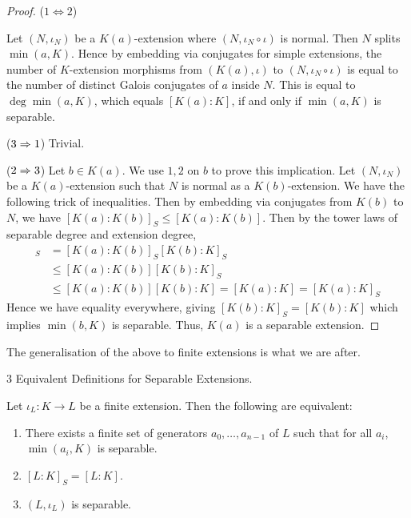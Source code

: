 \documentclass[../book.tex]{subfiles}
\begin{document}
\begin{proof}
    ($1\iff 2$)
    
        Let $(N,\iota_N)$ be a $K(a)$-extension where 
        $(N,\iota_N\circ\iota)$ is normal. 
        Then $N$ splits $\min(a,K)$. 
        Hence by embedding via conjugates for simple extensions,
        the number of $K$-extension morphisms 
        from $(K(a),\iota)$ to $(N,\iota_N\circ\iota)$
        is equal to the number of distinct Galois conjugates of $a$
        inside $N$. 
        This is equal to $\deg\min(a,K)$, which equals $[K(a):K]$,
        if and only if $\min(a,K)$ is separable. 
        
    ($3\Rightarrow 1$) 
        Trivial.
    
    ($2 \Rightarrow 3$)
        Let $b \in K(a)$. We use $1,2$ on $b$ to prove this implication. 
        Let $(N,\iota_N)$ be a $K(a)$-extension such that 
        $N$ is normal as a $K(b)$-extension. 
        We have the following trick of inequalities. 
        Then by embedding via conjugates from $K(b)$ to $N$, 
        we have $[K(a):K(b)]_S \leq [K(a):K(b)]$.
        Then by the tower laws of separable degree and extension degree,
        \begin{align*}
            [K(a) : K]_S &= [K(a):K(b)]_S [K(b):K]_S \\
            &\leq [K(a):K(b)] [K(b):K]_S \\
            &\leq [K(a):K(b)] [K(b):K] = [K(a):K] = [K(a):K]_S
        \end{align*}
        Hence we have equality everywhere, giving 
        $[K(b):K]_S = [K(b):K]$ which implies $\min(b,K)$ is separable.
        Thus, $K(a)$ is a separable extension. 
\end{proof}
The generalisation of the above to finite extensions is what we are after. 
\begin{thm} 3 Equivalent Definitions for Separable Extensions.
    
    Let $\iota_L : K \to L$ be a finite extension.
    Then the following are equivalent:
    \begin{enumerate}
        \item There exists a finite set of generators $a_0,\dots,a_{n-1}$ of $L$ 
            such that for all $a_i$, $\min(a_i,K)$ is separable. 
        \item $[L:K]_S = [L:K]$.
        \item $(L,\iota_L)$ is separable.
    \end{enumerate}
\end{thm}
\end{document}
